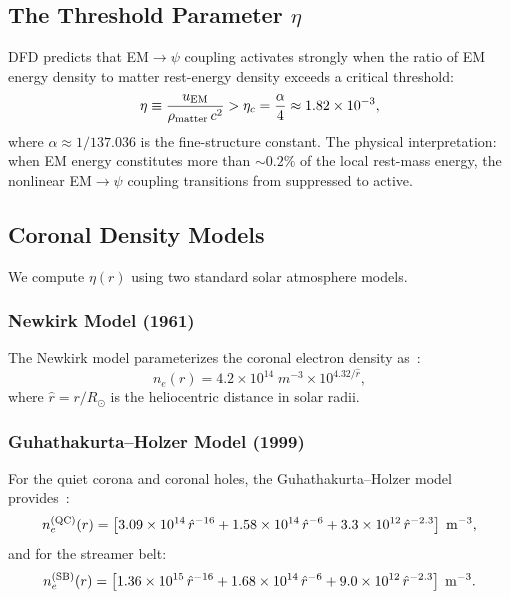 \documentclass[aps,prd,twocolumn,superscriptaddress,floatfix,nofootinbib]{revtex4-2}
\newcommand{\Rsun}{R_\odot}
\begin{document}
\subsection{The Threshold Parameter $\eta$}\label{sec:eta-def}

DFD predicts that EM$\to\psi$ coupling activates strongly when the
ratio of EM energy density to matter rest-energy density exceeds
a critical threshold:
\begin{equation}
\eta \equiv \frac{u_{\rm EM}}{\rho_{\rm matter}\,c^2}
> \eta_c = \frac{\alpha}{4} \approx 1.82 \times 10^{-3},
\label{eq:eta-threshold}
\end{equation}
where $\alpha \approx 1/137.036$ is the fine-structure constant.
The physical interpretation: when EM energy constitutes more than
$\sim 0.2\%$ of the local rest-mass energy, the nonlinear
EM$\to\psi$ coupling transitions from suppressed to active.

\subsection{Coronal Density Models}\label{sec:density-models}

We compute $\eta(r)$ using two standard solar atmosphere models.

\subsubsection{Newkirk Model (1961)}

The Newkirk model parameterizes the coronal electron density
as~\cite{Newkirk1961}:
\begin{equation}
n_e(r) = 4.2 \times 10^{14}\;\si{m^{-3}}
\times 10^{4.32/\hat{r}},
\label{eq:newkirk}
\end{equation}
where $\hat{r} = r/\Rsun$ is the heliocentric distance in solar radii.

\subsubsection{Guhathakurta--Holzer Model (1999)}

For the quiet corona and coronal holes, the Guhathakurta--Holzer
model provides~\cite{Guhathakurta1999}:
\begin{equation}
n_e^{(\rm QC)}(r) = \left[3.09\times10^{14}\,\hat{r}^{-16}
+ 1.58\times10^{14}\,\hat{r}^{-6}
+ 3.3\times10^{12}\,\hat{r}^{-2.3}\right]\;\si{m^{-3}},
\label{eq:GH-quiet}
\end{equation}
and for the streamer belt:
\begin{equation}
n_e^{(\rm SB)}(r) = \left[1.36\times10^{15}\,\hat{r}^{-16}
+ 1.68\times10^{14}\,\hat{r}^{-6}
+ 9.0\times10^{12}\,\hat{r}^{-2.3}\right]\;\si{m^{-3}}.
\label{eq:GH-streamer}
\end{equation}
\end{document}
